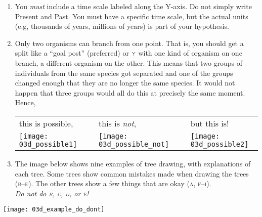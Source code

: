 \documentclass[12pt]{exam}
\begin{document}
\begin{enumerate}
\item
  You \emph{must} include a time scale labeled along the Y-axis. Do
  not simply write Present and Past. You must have a specific time
  scale, but the actual units (e.g, thousands of years, millions of
  years) is part of your hypothesis.

\item
  Only two organisms can branch from one point. That is, you should get
  a split like a “goal post” (preferred) or {\Large$\Ydown$} with one kind of 
  organism on one branch, a
  different organism on the other. This means that two groups of individuals
  from the same species got separated and one of the groups changed
  enough that they are no longer the same species. It would not happen
  that three groups would all do this at precisely the same moment.
  Hence,

\newpage

\begin{longtable}[c]{@{}lL{0.2in}lL{0.2in}l@{}}
this is possible, & &
this is \emph{not}, & &
but this is!\tabularnewline
%
\texttt{[image: 03d\_possible1]} & &
\texttt{[image: 03d\_possible\_not]} & &
\texttt{[image: 03d\_possible2]}\tabularnewline
%
\end{longtable}


\item
  The image below shows nine examples of tree drawing, with explanations of each tree.   Some trees show common mistakes made when drawing the trees (\textsc{b}--\textsc{e}).
  The other trees show a few things that are okay (\textsc{a, f--i}).\\[1\baselineskip] \textit{Do not do \textsc{b, c,  d,} or \textsc{e}!}

\end{enumerate}

\noindent\texttt{[image: 03d\_example\_do\_dont]}
\end{document}
